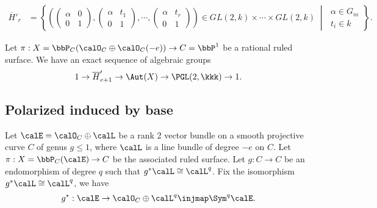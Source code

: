 \[\begin{aligned}
        \overline{H}'_r &= \left\{ \left( 
            \begin{pmatrix} \alpha & 0 \\ 0 & 1 \end{pmatrix}, 
            \begin{pmatrix} \alpha & t_1 \\ 0 & 1 \end{pmatrix}, 
            \cdots, 
            \begin{pmatrix} \alpha & t_r \\ 0 & 1 \end{pmatrix} 
            \right) \in GL(2,k) \times \cdots \times GL(2,k) 
            \;\middle|\;
            \begin{array}{l}
                \alpha \in G_m \\
                t_i \in k
            \end{array} \right\} .
    \end{aligned} \]

    \begin{theorem}\label{thm:auto_group_of_rational_ruled_surface}
        Let \(\pi:X = \bbP_C(\calO_C\oplus \calO_C(-e)) \to C = \bbP^1\) be a rational ruled surface. 
        We have an exact sequence of algebraic groups
        \[ 1 \to \overline{H}'_{e+1} \to \Aut(X) \to \PGL(2,\kkk) \to 1. \]
    \end{theorem}

\subsection{Polarized induced by base}

    Let \(\calE = \calO_C \oplus \calL\) be a rank 2 vector bundle on a smooth projective curve \(C\) of genus \(g\leq 1\), where \(\calL\) is a line bundle of degree \(-e\) on \(C\).
    Let \(\pi:X = \bbP_C(\calE) \to C\) be the associated ruled surface.
    Let \(g:C \to C\) be an endomorphism of degree \(q\) such that \(g^*\calL \cong \calL^q\). 
    Fix the isomorphism \(g^*\calL \cong \calL^q\), we have
    \[ g^*: \calE \to \calO_C \oplus \calL^q \injmap \Sym^q \calE. \]
